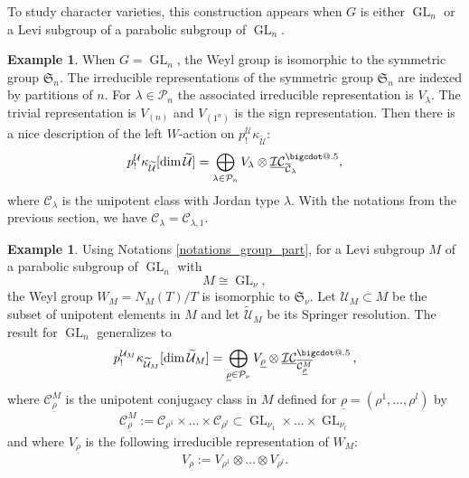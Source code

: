 \documentclass[JEP,XML,SOM,NoEqCountersInSection,Unicode,published]{cedram}
\makeatletter
\newcommand*\bigcdot{\mathpalette\bigcdot@{.5}}
\newcommand*\bigcdot@[2]{\mathbin{\vcenter{\hbox{\scalebox{#2}{$\m@th#1\bullet$}}}}}
\theoremstyle{definition}
\newtheorem{example}[definition]{Example}
\theoremstyle{plain}
\DeclareMathOperator{\GL}{GL}
\newcommand{\sn}{\mathfrak{S}_n}
\newcommand{\Sym}{\mathfrak{S}}
\newcommand{\Part}{\mathcal{P}}
\makeatother
\begin{document}
To study character varieties, this construction appears when $G$ is either $\GL_n$ or a Levi subgroup of a parabolic subgroup of $\GL_n$.
\begin{example}
When $G=\GL_n$, the Weyl group is isomorphic to the symmetric group $\sn$. The irreducible representations of the symmetric group $\sn$ are indexed by partitions of $n$. For $\lambda\in\Part_n$ the associated irreducible representation is $V_\lambda$. The trivial representation is $V_{(n)}$ and $V_{(1^n)}$ is the sign representation. Then there is a nice description of the left $W$-action on $p^{\mathcal{U}}_!\kappa_{\widetilde{\mathcal{U}}}$:
\[
p^{\mathcal{U}}_! \kappa_{\widetilde{\mathcal{U}}}[\dim\widetilde{\mathcal{U}}] =\bigoplus_{\lambda\in \Part_n} V_{\lambda}\otimes\underline{\mathcal{I C}}^{\bigcdot}_{\overline{\mathcal{C}}_{\lambda}},
\]
where $\mathcal{C}_{\lambda}$ is the unipotent class with Jordan type $\lambda$. With the notations from the previous section, we have $\mathcal{C}_{\lambda}=\mathcal{C}_{\lambda,1}$.
\end{example}

\begin{example}
Using Notations \ref{notations_group_part}, for a Levi subgroup $M$ of a parabolic subgroup of $\GL_n$ with
\[
M\cong \GL_{\nu},
\]
the Weyl group $W_M = N_M (T)/T$ is isomorphic to $\Sym_{\nu}$. Let $\mathcal{U}_M\subset M$ be the subset of unipotent elements in $M$ and let $\widetilde{\mathcal{U}}_M$ be its Springer resolution. The result for $\GL_n$ generalizes to
\begin{equation}\label{eq_Springer_NL}
p_!^{\mathcal{U}_M} \kappa_{\widetilde{\mathcal{U}}_M}[\dim \widetilde{\mathcal{U}}_M]=\bigoplus_{\underline{\rho}\in \Part_{\nu}} V_{\underline{\rho}}\otimes \underline{\mathcal{I C}}^{\bigcdot}_{\overline{\mathcal{C}^M_{\underline{\rho}}}}\,,
\end{equation}
where $\mathcal{C}^M_{\underline{\rho}}$ is the unipotent conjugacy class in $M$ defined for $\underline{\rho}=\left(\rho^{1},\dots,\rho^{l}\right)$ by
\[
\mathcal{C}^M_{\underline{\rho}}:=\mathcal{C}_{\rho^{1}}\times\dots\times\mathcal{C}_{\rho^{l}}\subset \GL_{\nu_1}\times\dots\times\GL_{\nu_l}
\]
and where $V_{\underline{\rho}}$ is the following irreducible representation of $W_M$:
\[
V_{\underline{\rho}}:=V_{\rho^1}\otimes\dots\otimes V_{\rho^l}.
\]
\end{example}
\end{document}
